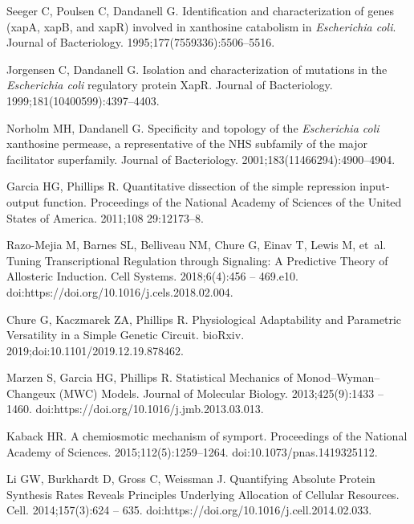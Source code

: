 \documentclass[10pt,letterpaper]{article}
\begin{document}
\begin{thebibliography}{10}
		Seeger C, Poulsen C, Dandanell G.
		\newblock Identification and characterization of genes (xapA, xapB, and xapR)
		involved in xanthosine catabolism in \emph{Escherichia coli}.
		\newblock Journal of Bacteriology. 1995;177(7559336):5506--5516.
		
		Jorgensen C, Dandanell G.
		\newblock Isolation and characterization of mutations in the \emph{Escherichia
			coli} regulatory protein XapR.
		\newblock Journal of Bacteriology. 1999;181(10400599):4397--4403.
		
		Norholm MH, Dandanell G.
		\newblock Specificity and topology of the \emph{Escherichia coli} xanthosine
		permease, a representative of the NHS subfamily of the major facilitator
		superfamily.
		\newblock Journal of Bacteriology. 2001;183(11466294):4900--4904.
		
		Garcia HG, Phillips R.
		\newblock Quantitative dissection of the simple repression input-output
		function.
		\newblock Proceedings of the National Academy of Sciences of the United States
		of America. 2011;108 29:12173--8.
		
		Razo-Mejia M, Barnes SL, Belliveau NM, Chure G, Einav T, Lewis M, et~al.
		\newblock Tuning Transcriptional Regulation through Signaling: A Predictive
		Theory of Allosteric Induction.
		\newblock Cell Systems. 2018;6(4):456 -- 469.e10.
		\newblock doi:{https://doi.org/10.1016/j.cels.2018.02.004}.
		
		Chure G, Kaczmarek ZA, Phillips R.
		\newblock Physiological Adaptability and Parametric Versatility in a Simple
		Genetic Circuit.
		\newblock bioRxiv. 2019;doi:{10.1101/2019.12.19.878462}.
		
		Marzen S, Garcia HG, Phillips R.
		\newblock Statistical Mechanics of Monod--Wyman--Changeux (MWC) Models.
		\newblock Journal of Molecular Biology. 2013;425(9):1433 -- 1460.
		\newblock doi:{https://doi.org/10.1016/j.jmb.2013.03.013}.
		
		Kaback HR.
		\newblock A chemiosmotic mechanism of symport.
		\newblock Proceedings of the National Academy of Sciences.
		2015;112(5):1259--1264.
		\newblock doi:{10.1073/pnas.1419325112}.
		
		Li GW, Burkhardt D, Gross C, Weissman J.
		\newblock Quantifying Absolute Protein Synthesis Rates Reveals Principles
		Underlying Allocation of Cellular Resources.
		\newblock Cell. 2014;157(3):624 -- 635.
		\newblock doi:{https://doi.org/10.1016/j.cell.2014.02.033}.
		

\end{thebibliography}
\end{document}
